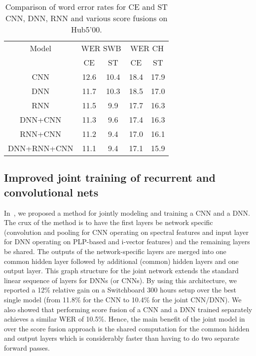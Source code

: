 \documentclass[a4paper]{article}
\begin{document}
\begin{table}[htpb!]
\begin{center}
\begin{tabular}{|c|c|c|c|c|} \hline
Model   & \multicolumn{2}{|c|}{WER SWB} & \multicolumn{2}{|c|}{WER CH}\\ \cline{2-5}
        & CE     & ST     & CE     & ST     \\ \hline 
CNN     & 12.6 & 10.4 & 18.4 & 17.9 \\ \hline
DNN     & 11.7 & 10.3 & 18.5 & 17.0 \\ \hline
RNN     & 11.5 & 9.9  & 17.7 & 16.3 \\ \hline
DNN+CNN & 11.3 & 9.6  & 17.4 & 16.3 \\ \hline
RNN+CNN & 11.2 & 9.4  & 17.0 & 16.1 \\ \hline
DNN+RNN+CNN & 11.1 & 9.4 & 17.1 & 15.9 \\ \hline
\end{tabular}
\end{center}
\caption{\label{net-tab}
Comparison of word error rates for CE and ST CNN, DNN, RNN and various score fusions on Hub5'00.}
\end{table}

\subsection{Improved joint training of recurrent and convolutional nets}
\label{joint}

In~\cite{soltau14}, we proposed a method for jointly modeling and
training a CNN and a DNN. The crux of the method is to have the first
layers be network specific (convolution and pooling for CNN operating
on spectral features and input layer for DNN operating on PLP-based
and i-vector features) and the remaining layers be shared. The outputs
of the network-specific layers are merged into one common hidden layer
followed by additional (common) hidden layers and one output
layer. This graph structure for the joint network extends the standard
linear sequence of layers for DNNs (or CNNs). By using this
architecture, we reported a 12\% relative gain on a Switchboard 300
hours setup over the best single model (from 11.8\% for the CNN to
10.4\% for the joint CNN/DNN). We also showed that performing score
fusion of a CNN and a DNN trained separately achieves a similar WER of
10.5\%. Hence, the main benefit of the joint model in~\cite{soltau14} over
the score fusion approach is the shared computation for the common
hidden and output layers which is considerably faster than having to
do two separate forward passes.
\end{document}
